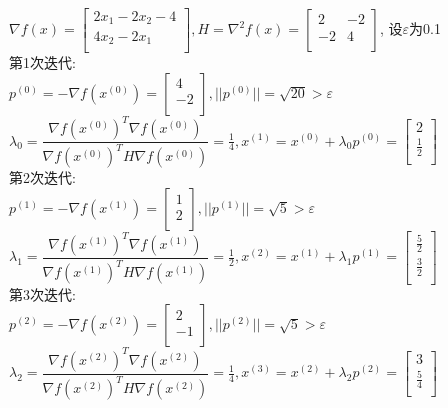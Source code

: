 \begin{solution}
    $\nabla f(x)=\begin{bmatrix}
        2x_1-2x_2-4  \\
        4x_2-2x_1  \\
    \end{bmatrix}, H=\nabla^2 f(x)=\begin{bmatrix}
        2   & -2  \\
        -2  & 4  \\
    \end{bmatrix}$,
    设$\varepsilon$为0.1\\
第1次迭代:\\
$p^{(0)}=-\nabla f(x^{(0)})=\begin{bmatrix} 4\\-2\\\end{bmatrix},||p^{(0)}||=\sqrt{20}>\varepsilon$\\
$\lambda_0=\dfrac{\nabla f(x^{(0)})^T\nabla f(x^{(0)})}{\nabla f(x^{(0)})^TH\nabla f(x^{(0)})}=\frac{1}{4},x^{(1)}=x^{(0)}+\lambda_0p^{(0)}=\begin{bmatrix} 2\\\frac{1}{2}\\\end{bmatrix}$\\
第2次迭代:\\
$p^{(1)}=-\nabla f(x^{(1)})=\begin{bmatrix} 1\\2\\\end{bmatrix},||p^{(1)}||=\sqrt{5}>\varepsilon$\\
$\lambda_1=\dfrac{\nabla f(x^{(1)})^T\nabla f(x^{(1)})}{\nabla f(x^{(1)})^TH\nabla f(x^{(1)})}=\frac{1}{2},x^{(2)}=x^{(1)}+\lambda_1p^{(1)}=\begin{bmatrix} \frac{5}{2}\\\frac{3}{2}\\\end{bmatrix}$\\
第3次迭代:\\
$p^{(2)}=-\nabla f(x^{(2)})=\begin{bmatrix} 2\\-1\\\end{bmatrix},||p^{(2)}||=\sqrt{5}>\varepsilon$\\
$\lambda_2=\dfrac{\nabla f(x^{(2)})^T\nabla f(x^{(2)})}{\nabla f(x^{(2)})^TH\nabla f(x^{(2)})}=\frac{1}{4},x^{(3)}=x^{(2)}+\lambda_2p^{(2)}=\begin{bmatrix} 3\\\frac{5}{4}\\\end{bmatrix}$\\

\end{solution}
